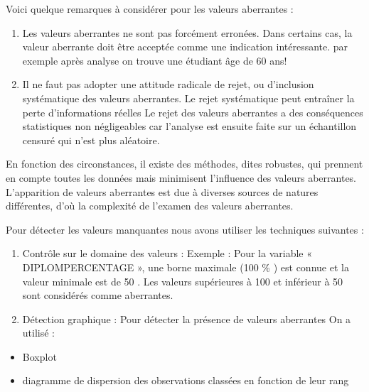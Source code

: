 Voici quelque remarques à considérer pour les valeurs aberrantes :
\begin{enumerate}
	\item Les valeurs aberrantes ne sont pas forcément erronées. Dans certains
	cas, la valeur aberrante doit être acceptée comme une indication
	intéressante. par exemple après analyse on trouve une étudiant âge de 60
	ans! 
	\item Il ne faut pas adopter une attitude radicale de rejet, ou
	d'inclusion systématique des valeurs aberrantes. Le rejet systématique
	peut entraîner la perte d'informations réelles Le rejet des valeurs
	aberrantes a des conséquences statistiques non négligeables car
	l'analyse est ensuite faite sur un échantillon censuré qui n'est plus
	aléatoire.
\end{enumerate}
En fonction des circonstances, il existe des méthodes,
dites robustes, qui prennent en compte toutes les données mais
minimisent l'influence des valeurs aberrantes. 
L'apparition de valeurs aberrantes est due à diverses sources de natures différentes, d'où la
complexité de l'examen des valeurs aberrantes.

Pour détecter les valeurs manquantes nous avons utiliser les techniques
suivantes :

\begin{enumerate}
	\def\labelenumi{\alph{enumi})}
	\item
	Contrôle sur le domaine des valeurs : Exemple : Pour la variable «
	DIPLOMPERCENTAGE », une borne maximale (100 \% ) est connue et la
	valeur minimale est de 50 . Les valeurs supérieures à 100 et
	inférieur à 50 sont considérés comme aberrantes.
	\item
	Détection graphique : Pour détecter la présence de valeurs aberrantes
	On a utilisé :
\end{enumerate}

\begin{itemize}
	\item
	Boxplot
	\item
	diagramme de dispersion des observations classées en fonction de leur
	rang
\end{itemize}

